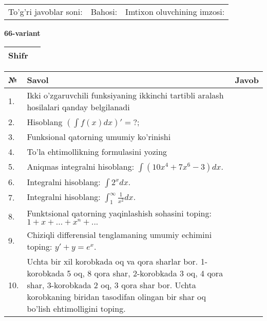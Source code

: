 \documentclass{article}
\begin{document}
  \vspace{1cm}
  
  \begin{tabular}{lll}
  To'g'ri javoblar soni: \underline{\hspace{1.5cm}} & 
  Bahosi: \underline{\hspace{1.5cm}} & 
  Imtixon oluvchining imzosi: \underline{\hspace{2cm}} \\
  \end{tabular}
  
  \egroup
  
  \newpage
  
  
  \textbf{66-variant}\\
  
  \bgroup
  \def\arraystretch{1.6} %
  
  \begin{tabular}{|m{5.7cm}|m{9.5cm}|}
  \hline
  Shifr & \\
  \hline
  \end{tabular}
  
  \vspace{1cm}
  
  \begin{tabular}{|m{0.7cm}|m{10cm}|m{4cm}|}
  \hline
  № & Savol & Javob \\
  \hline
  1. & Ikki o'zgaruvchili funksiyaning ikkinchi tartibli aralash hosilalari qanday belgilanadi &  \\
  \hline
  2. & Hisoblang \(\left( \int {f(x)dx} \right)' = ?\); &  \\
  \hline
  3. & Funksional qatorning umumiy ko'rinishi &  \\
  \hline
  4. & To'la ehtimollikning formulasini yozing &  \\
  \hline
  5. & Aniqmas integralni hisoblang: \(\int {\left( 10x^{4} + 7x^{6} - 3 \right)dx}\). &  \\
  \hline
  6. & Integralni hisoblang: \(\int {2^{x}dx}\). &  \\
  \hline
  7. & Integralni hisoblang: \(\int_{1}^{\infty}{\frac{1}{x^{2}}dx}\). &  \\
  \hline
  8. & Funktsional qatorning yaqinlashish sohasini toping:\(1 + x + ... + x^{n} + ...\) &  \\
  \hline
  9. & Chiziqli differensial tenglamaning umumiy echimini toping: \(y' + y = e^{x}\). &  \\
  \hline
  10. & Uchta bir xil korobkada oq va qora sharlar bor. 1-korobkada 5 oq, 8 qora shar, 2-korobkada 3 oq, 4 qora shar, 3-korobkada 2 oq, 3 qora shar bor. Uchta korobkaning biridan tasodifan olingan bir shar oq bo'lish ehtimolligini toping. &  \\
  \hline
  \end{tabular}
  
\end{document}

